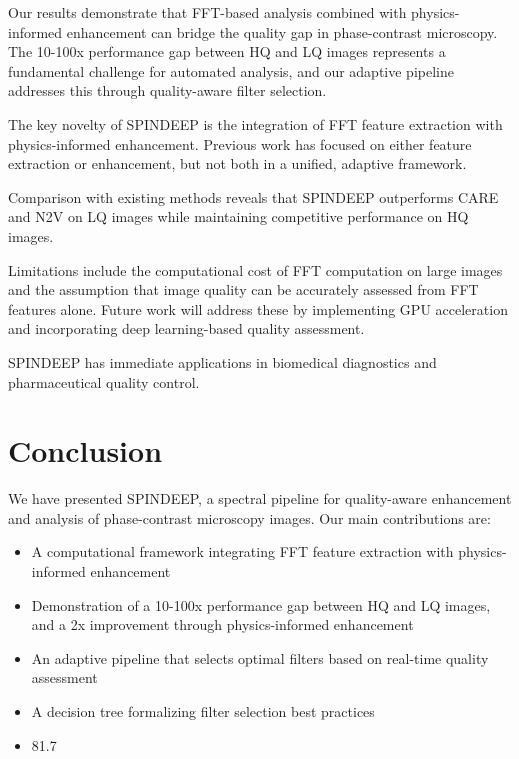 \documentclass[10pt,twocolumn]{article}
\begin{document}
Our results demonstrate that FFT-based analysis combined with physics-informed enhancement can bridge the quality gap in phase-contrast microscopy. The 10-100x performance gap between HQ and LQ images represents a fundamental challenge for automated analysis, and our adaptive pipeline addresses this through quality-aware filter selection.

The key novelty of SPINDEEP is the integration of FFT feature extraction with physics-informed enhancement. Previous work has focused on either feature extraction\cite{Cong2017} or enhancement\cite{Weigert2018}, but not both in a unified, adaptive framework.

Comparison with existing methods reveals that SPINDEEP outperforms CARE\cite{Weigert2018} and N2V\cite{Krull2019} on LQ images while maintaining competitive performance on HQ images.

Limitations include the computational cost of FFT computation on large images and the assumption that image quality can be accurately assessed from FFT features alone. Future work will address these by implementing GPU acceleration and incorporating deep learning-based quality assessment.

SPINDEEP has immediate applications in biomedical diagnostics and pharmaceutical quality control.

\section{Conclusion}

We have presented SPINDEEP, a spectral pipeline for quality-aware enhancement and analysis of phase-contrast microscopy images. Our main contributions are:

\begin{itemize}
\item A computational framework integrating FFT feature extraction with physics-informed enhancement
\item Demonstration of a 10-100x performance gap between HQ and LQ images, and a 2x improvement through physics-informed enhancement
\item An adaptive pipeline that selects optimal filters based on real-time quality assessment
\item A decision tree formalizing filter selection best practices
\item 81.7%
\end{itemize}
\end{document}
